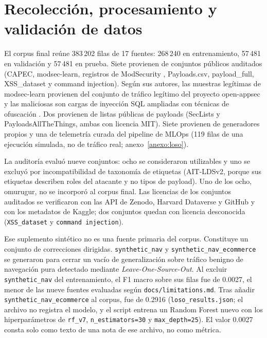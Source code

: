 \section{Recolección, procesamiento y validación de datos}

El corpus final reúne 383\,202 filas de 17 fuentes: 268\,240 en entrenamiento, 57\,481 en validación y 57\,481 en prueba. Siete provienen de conjuntos públicos auditados (CAPEC, modsec-learn, registros de ModSecurity \parencite{lucz2025}, Payloads.csv\parencite{shahane2021payloads}, payload\_full\parencite{thakur2025payloadfull}, XSS\_dataset\parencite{shah2020xss} y command injection\parencite{pawase2024cmdi}). Según sus autores, las muestras legítimas de modsec-learn provienen del conjunto de tráfico legítimo del proyecto open-appsec y las maliciosas son cargas de inyección SQL ampliadas con técnicas de ofuscación \parencite{scano2024modseclearn}. Dos provienen de listas públicas de payloads (SecLists\parencite{seclists} y PayloadsAllTheThings\parencite{payloadsallthethings}, ambas con licencia MIT). Siete provienen de generadores propios y una de telemetría curada del pipeline de MLOps (119 filas de una ejecución simulada, no de tráfico real; anexo~\ref{anexo:loso}).

La auditoría evaluó nueve conjuntos: ocho se consideraron utilizables y uno se excluyó por incompatibilidad de taxonomía de etiquetas (AIT-LDSv2, porque sus etiquetas describen roles del atacante y no tipos de payload). Uno de los ocho, omurugur, no se incorporó al corpus final. Las licencias de los conjuntos auditados se verificaron con las API de Zenodo, Harvard Dataverse y GitHub y con los metadatos de Kaggle; dos conjuntos quedan con licencia desconocida (\texttt{XSS\_dataset} y \texttt{command injection}).

Ese suplemento sintético no es una fuente primaria del corpus. Constituye un conjunto de correcciones dirigidas. \texttt{synthetic\_nav} y \texttt{synthetic\_nav\_ecommerce} se generaron para cerrar un vacío de generalización sobre tráfico benigno de navegación pura detectado mediante \textit{Leave-One-Source-Out}. Al excluir \texttt{synthetic\_nav} del entrenamiento, el F1 macro sobre sus filas fue de 0.0027, el menor de las nueve fuentes evaluadas según \texttt{docs/limitations.md}. Tras añadir \texttt{synthetic\_nav\_ecommerce} al corpus, fue de 0.2916 (\texttt{loso\_results.json}; el archivo no registra el modelo, y el script entrena un Random Forest nuevo con los hiperparámetros de \texttt{rf\_v7}, \texttt{n\_estimators=30} y \texttt{max\_depth=25}). El valor 0.0027 consta solo como texto de una nota de ese archivo, no como métrica.

